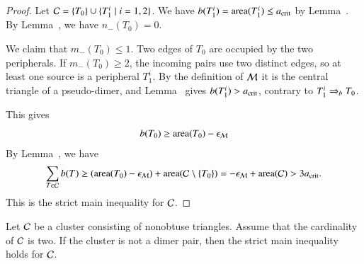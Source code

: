 \begin{proof}  
  Let $\mathcal C = \{T_0\}\cup \{T_1^i \mid i=1,2\}$.  We have $b(T_1^i) =
  {\operatorname{area}}(T_1^i)\le a_\text{crit}$ by Lemma~.  By
  Lemma~, we have
  $n_-(T_0)=0$.

  We claim that $m_-(T_0)\le1$.  Two edges of $T_0$ are occupied
  by the two peripherals.  If $m_-(T_0)\ge2$, the incoming pairs
  use two distinct edges, so at least one source is a peripheral
  $T_1^i$.  By the definition of $\mathcal M$ it is the central triangle
  of a pseudo-dimer, and Lemma~ gives
  $b(T_1^i)>a_\text{crit}$, contrary to $T_1^i\Rightarrow_{b} T_0$.

This gives
\[
b(T_0) \ge {\operatorname{area}}(T_0) - \epsilon_{\mathcal M}
\]
By Lemma~, we have
\[
\sum_{T\in\mathcal C} b(T) \ge ({\operatorname{area}}(T_0) - \epsilon_{\mathcal M}) +  {\operatorname{area}}(\mathcal C\setminus \{T_0\}) 
= -\epsilon_{\mathcal M}+ {\operatorname{area}}(\mathcal C) > 3a_\text{crit}.
\]
This is the strict main inequality for $\mathcal C$.
\end{proof}

\begin{lemma} 
  Let $\mathcal C$ be a cluster consisting of nonobtuse triangles.  Assume
  that the cardinality of $\mathcal C$ is two.  If the cluster is not a dimer
  pair, then the strict main inequality holds for $\mathcal C$.
\end{lemma}

